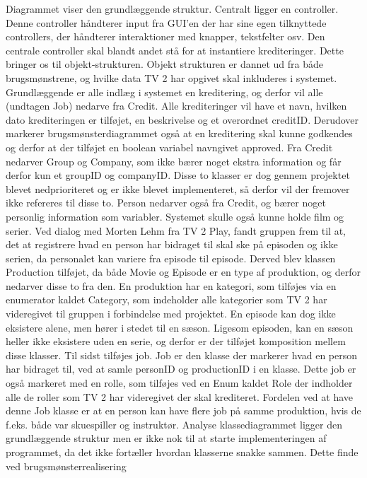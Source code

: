 Diagrammet viser den grundlæggende struktur. Centralt ligger en controller. Denne controller håndterer input fra GUI'en der har sine egen tilknyttede controllers, der håndterer interaktioner med knapper, tekstfelter osv. Den centrale controller skal blandt andet stå for at instantiere krediteringer. Dette bringer os til objekt-strukturen. Objekt strukturen er dannet ud fra både brugsmønstrene, og hvilke data TV 2 har opgivet skal inkluderes i systemet. Grundlæggende er alle indlæg i systemet en kreditering, og derfor vil alle (undtagen Job) nedarve fra Credit. Alle krediteringer vil have et navn, hvilken dato krediteringen er tilføjet, en beskrivelse og et overordnet creditID. Derudover markerer brugsmønsterdiagrammet også at en kreditering skal kunne godkendes og derfor at der tilføjet en boolean variabel navngivet approved. Fra Credit nedarver Group og Company, som ikke bærer noget ekstra information og får derfor kun et groupID og companyID. Disse to klasser er dog gennem projektet blevet nedprioriteret og er ikke blevet implementeret, så derfor vil der fremover ikke refereres til disse to. Person nedarver også fra Credit, og bærer noget personlig information som variabler. Systemet skulle også kunne holde film og serier. Ved dialog med Morten Lehm fra TV 2 Play, fandt gruppen frem til at, det at registrere hvad en person har bidraget til skal ske på episoden og ikke serien, da personalet kan variere fra episode til episode. Derved blev klassen Production tilføjet, da både Movie og Episode er en type af produktion, og derfor nedarver disse to fra den. En produktion har en kategori, som tilføjes via en enumerator kaldet Category, som indeholder alle kategorier som TV 2 har videregivet til gruppen i forbindelse med projektet. En episode kan dog ikke eksistere alene, men hører i stedet til en sæson. Ligesom episoden, kan en sæson heller ikke eksistere uden en serie, og derfor er der tilføjet komposition mellem disse klasser. Til sidst tilføjes job. Job er den klasse der markerer hvad en person har bidraget til, ved at samle personID og productionID i en klasse. Dette job er også markeret med en rolle, som tilføjes ved en Enum kaldet Role der indholder alle de roller som TV 2 har videregivet der skal krediteret. Fordelen ved at have denne Job klasse er at en person kan have flere job på samme produktion, hvis de f.eks. både var skuespiller og instruktør.
Analyse klassediagrammet ligger den grundlæggende struktur men er ikke nok til at starte implementeringen af programmet, da det ikke fortæller hvordan klasserne snakke sammen. Dette finde ved brugsmønsterrealisering

